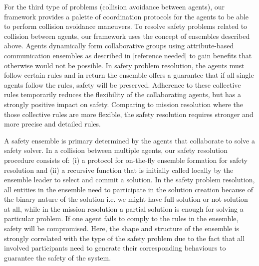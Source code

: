 \documentclass[journal]{IEEEtran}
\theoremstyle{definition}
\begin{document}
For the third type of problems (collision avoidance between agents), our framework provides a palette of coordination protocols for the agents to be able to perform collision avoidance maneuvers. 
To resolve safety problems related to collision between agents, our framework uses the concept of ensembles described above.
Agents dynamically form collaborative groups using attribute-based communication ensembles as described in [reference needed] to gain benefits that otherwise
would not be possible. In safety problem resolution, the agents must follow certain rules and in return the ensemble offers a guarantee that if all single agents follow the rules, safety will be preserved. Adherence to these collective
rules temporarily reduces the flexibility of the collaborating agents, but has a strongly positive impact on safety. Comparing to mission resolution where the those collective rules are more flexible, the safety resolution requires stronger and more precise and detailed rules. 


A safety ensemble is primary determined by the agents that collaborate to solve a safety solver. In a collision between multiple agents, our safety resolution procedure consists of: (i) a protocol for on-the-fly ensemble formation for safety resolution and (ii) a recursive function that is initially called locally by the ensemble leader to select and commit a solution. In the safety problem resolution, all entities in the ensemble need to participate in the solution creation because of the binary nature of the solution i.e. we might have full solution or not solution at all,
while in the mission resolution a partial solution is enough for solving a particular problem.
If one agent fails to comply to the rules in the ensemble, safety will be compromised. Here, the shape and structure of the ensemble is strongly correlated with the type of the safety problem due to the fact that all involved participants need to generate their corresponding behaviours to guarantee the safety of the system.


\end{document}
